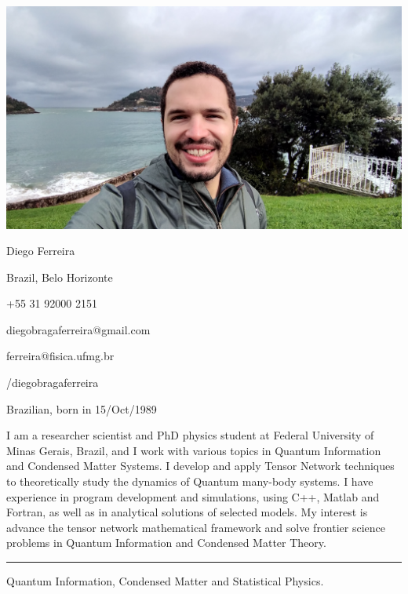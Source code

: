 \documentclass[a4paper,10pt]{article}
\newlength{\cvcolumngapwidth}
\newlength{\cvleftcolumnwidth}
\newlength{\cvrightcolumnwidth}
\newcommand{\cvnamestyle}[1]{{\Large\cvnamefont\textcolor{cvnamecolor}{#1}}}
\newcommand{\cvsectionstyle}[1]{{\normalsize\cvsectionfont\textcolor{cvsectioncolor}{#1}}}
\newcommand{\cvtitlestyle}[1]{{\normalsize\cvtitlefont\textcolor{cvtitlecolor}{#1}}}
\newcommand{\cvdurationstyle}[1]{{\normalsize\cvdurationfont\textcolor{cvdurationcolor}{#1}}}
\newlength{\cvafteritemskipamount}
\newlength{\cvaftersectionskipamount}
\newlength{\cvafternameskipamount}
\newlength{\cvafterpersonalinfolineskipamount}
\newlength{\cvaftertitleskipamount}
\newlength{\cvparskip}
\newcommand{\cvpersonalinfo}[2]{
    \begin{minipage}[t]{\cvleftcolumnwidth}
        \vspace{0mm} %
        \raggedleft #1
    \end{minipage}%
    \hspace{\cvcolumngapwidth}%
    \begin{minipage}[t]{\cvrightcolumnwidth}
        \vspace{0mm} %
        #2
    \end{minipage}
    \vspace{\cvafteritemskipamount}}
\newcommand{\cvname}[1]{
    \cvnamestyle{#1}
    \vspace{\cvafternameskipamount}}
\newcommand{\cvpersonalinfolinewithicon}[3]{
    \raisebox{.5\fontcharht\font`E-.5\height}{\texttt{[image: \#2]}}
    #3
    \vspace{\cvafterpersonalinfolineskipamount}}
\newcommand{\cvsection}[1]{
    \begin{minipage}[t]{\cvleftcolumnwidth}
        \raggedleft\cvsectionstyle{#1}
    \end{minipage}%
    \hspace{\cvcolumngapwidth}%
    \begin{minipage}[t]{\cvrightcolumnwidth}
        \textcolor{cvrulecolor}{\rule{\cvrightcolumnwidth}{0.5mm}}
    \end{minipage}
    \vspace{\cvaftersectionskipamount}}
\newcommand{\cvitem}[2]{
    \begin{minipage}[t]{\cvleftcolumnwidth}
        \raggedleft #1
    \end{minipage}%
    \hspace{\cvcolumngapwidth}%
    \begin{minipage}[t]{\cvrightcolumnwidth}
        \setlength{\parskip}{\cvparskip} #2
    \end{minipage}
    \vspace{\cvafteritemskipamount}}
\newcommand{\cvtitle}[1]{
    \cvtitlestyle{#1}
    \vspace{\cvaftertitleskipamount}
    \vspace{-\cvparskip}}
\begin{document}
\cvpersonalinfo{\includegraphics[trim=1000 200 1100 200,clip,scale=0.08]{diego.jpg}} %
    {\cvname{Diego Ferreira}
    
    \cvpersonalinfolinewithicon{height=4.5mm}{globe.png}{Brazil, Belo Horizonte} %
    
    \cvpersonalinfolinewithicon{height=4.5mm}{phone.png}{+55 31 92000 2151} %
    
    \cvpersonalinfolinewithicon{height=4.5mm}{envelope.png}{diegobragaferreira@gmail.com} %
    
    \cvpersonalinfolinewithicon{height=4.5mm}{envelope.png}{ferreira@fisica.ufmg.br} %
    
    \cvpersonalinfolinewithicon{height=4.5mm}{github.png}{/diegobragaferreira}
    
    \cvpersonalinfolinewithicon{height=4.5mm}{passport.png}{Brazilian, born in 15/Oct/1989}
    
    \cvpersonalinfolinewithicon{height=4.5mm}{comment.png}{
    I am a researcher scientist and PhD physics student at Federal University of Minas Gerais, Brazil, 
    and I work with various topics in Quantum Information and Condensed Matter Systems.
    I develop and apply Tensor Network techniques to theoretically 
    study the dynamics of Quantum many-body systems.
    I have experience in program development and simulations, using 
    C++, Matlab and Fortran, as well as in analytical solutions of selected models.
    My interest is advance the tensor network mathematical framework and solve 
    frontier science problems in Quantum Information and Condensed Matter Theory.}}

    
\cvsection{Area of research}

\cvitem{\cvdurationstyle{}}
    {\cvtitle{}
    Quantum Information, Condensed Matter and Statistical Physics.
    }    
\end{document}
